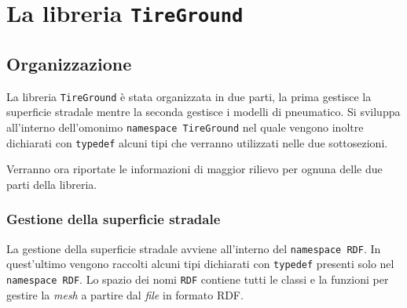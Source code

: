 \chapter{La libreria \texttt{TireGround}}
\label{Codice}
%
\section{Organizzazione}
La libreria \texttt{TireGround} è stata organizzata in due parti, la prima gestisce la superficie stradale mentre la seconda gestisce i modelli di pneumatico. Si sviluppa all'interno dell'omonimo \texttt{namespace TireGround} nel quale vengono inoltre dichiarati con \texttt{typedef} alcuni tipi che verranno utilizzati nelle due sottosezioni.

Verranno ora riportate le informazioni di maggior rilievo per ognuna delle due parti della libreria.


\subsection{Gestione della superficie stradale} 
La gestione della superficie stradale avviene all'interno del \texttt{namespace RDF}. In quest'ultimo vengono raccolti alcuni tipi dichiarati con \texttt{typedef} presenti solo nel \texttt{namespace RDF}. Lo spazio dei nomi \texttt{RDF} contiene tutti le classi e la funzioni per gestire la \textit{mesh} a partire dal \textit{file} in formato \ac{RDF}.
%
